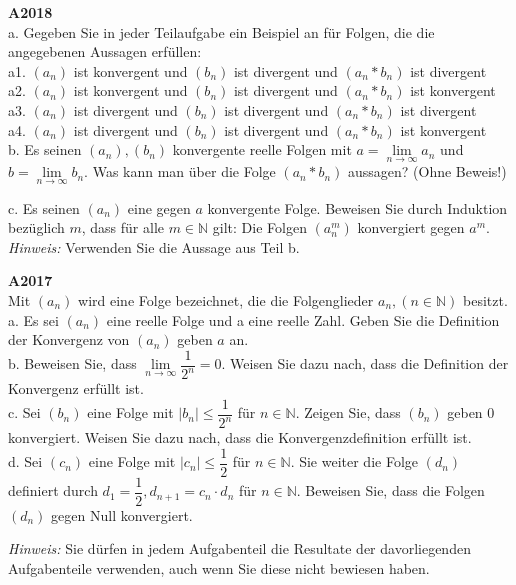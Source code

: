 \documentclass[landscape,twocolumn,a4paper]{article}
\begin{document}
\textbf{A2018} \\
a. Gegeben Sie in jeder Teilaufgabe ein Beispiel an für Folgen, die die angegebenen Aussagen erfüllen: \\
a1. $(a_n)$ ist konvergent und $(b_n)$ ist divergent und $(a_n * b_n)$ ist divergent \\
a2. $(a_n)$ ist konvergent und $(b_n)$ ist divergent und $(a_n * b_n)$ ist konvergent \\
a3. $(a_n)$ ist divergent und $(b_n)$ ist divergent und $(a_n * b_n)$ ist divergent \\
a4. $(a_n)$ ist divergent und $(b_n)$ ist divergent und $(a_n * b_n)$ ist konvergent \\

b. Es seinen $(a_n),(b_n)$ konvergente reelle Folgen mit $a = \lim \limits_{n \to \infty} a_n$ und
$b = \lim \limits_{n \to \infty} b_n$. Was kann man über die Folge $(a_n * b_n)$ aussagen? (Ohne Beweis!) 

c. Es seinen $(a_n)$ eine gegen $a$ konvergente Folge. Beweisen Sie durch Induktion bezüglich $m$, dass für 
alle $m \in \mathbb{N}$ gilt: Die Folgen $(a_n^m)$ konvergiert gegen $a^m$. \textit{Hinweis:} Verwenden Sie die Aussage aus Teil b.
\bigskip 

\newpage

\textbf{A2017} \\
Mit $(a_n)$ wird eine Folge bezeichnet, die die Folgenglieder $a_n, (n \in \mathbb{N})$ besitzt. \\
a. Es sei $(a_n)$ eine reelle Folge und a eine reelle Zahl. Geben Sie die Definition der Konvergenz von $(a_n)$ geben $a$ an. \\
b. Beweisen Sie, dass  $ \lim \limits_{n \to \infty} \dfrac{1}{2^n} = 0$. Weisen Sie dazu nach, dass die Definition der Konvergenz erfüllt ist. \\
c. Sei $(b_n)$ eine Folge mit $\left|b_n\right| \le \dfrac{1}{2^n}$ für $n \in \mathbb{N}$. Zeigen Sie,
dass $(b_n)$ geben $0$ konvergiert. Weisen Sie dazu nach, dass die Konvergenzdefinition erfüllt ist. \\
d. Sei $(c_n)$ eine Folge mit  $\left|c_n\right| \le \dfrac{1}{2}$ für $n \in \mathbb{N}$. Sie weiter die 
Folge $(d_n)$ definiert durch $d_1 = \dfrac{1}{2}, d_{n+1} = c_n \cdot d_n$ für $n \in \mathbb{N}$.
Beweisen Sie, dass die Folgen $(d_n)$ gegen Null konvergiert. 

\textit{Hinweis:} Sie dürfen in jedem Aufgabenteil die Resultate der davorliegenden Aufgabenteile verwenden, auch wenn Sie diese nicht bewiesen haben.
\bigskip 
\end{document}
